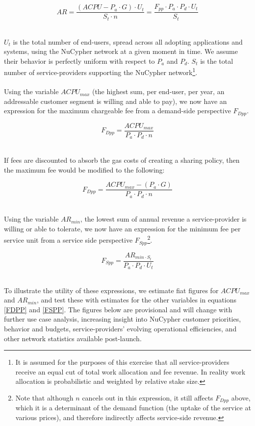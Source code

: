 \documentclass[longbibliography,nofootinbib]{revtex4-1}
\begin{document}
\begin{equation}
    AR = \frac{(ACPU - P_a \cdot G ) \cdot U_t}{S_t \cdot n} =  \frac{F_{pp} \cdot P_a \cdot P_d \cdot U_t}{S_t}
\end{equation} \
    
$U_t$ is the total number of end-users, spread across all adopting applications and systems, using the NuCypher network at a given moment in time. We assume their behavior is perfectly uniform with respect to $P_a$ and $P_d$. $S_t$ is the total number of service-providers supporting the NuCypher network\footnote{It is assumed for the purposes of this exercise that all service-providers receive an equal cut of total work allocation and fee revenue. In reality work allocation is probabilistic and weighted by relative stake size.}.
\\\\
Using the variable $ACPU_{max}$ (the highest sum, per end-user, per year, an addressable customer segment is willing and able to pay), we now have an expression for the maximum chargeable fee from a demand-side perspective $F_{Dpp}$. 

\begin{equation}
\label{FDPP}
    F_{Dpp} = \frac{ACPU_{max}}{P_a \cdot P_d \cdot n}
\end{equation} \

If fees are discounted to absorb the gas costs of creating a sharing policy, then the maximum fee would be modified to the following: 

\begin{equation}
    F_{Dpp} = \frac{ACPU_{max} - (P_a \cdot G)}{P_a \cdot P_d \cdot n}
\end{equation} \

Using the variable $AR_{min}$, the lowest sum of annual revenue a service-provider is willing or able to tolerate, we now have an expression for the minimum fee per service unit from a service side perspective $F_{Spp}$\footnote{Note that although $n$ cancels out in this expression, it still affects $F_{Dpp}$ above, which it is a determinant of the demand function (the uptake of the service at various prices), and therefore indirectly affects service-side revenue.}.

\begin{equation}
\label{FSPP}
    F_{Spp} = \frac{AR_{min \cdot S_t}}{P_a \cdot P_d \cdot U_t}
\end{equation} \ 

To illustrate the utility of these expressions, we estimate fiat figures for $ACPU_{max}$ and $AR_{min}$, and test these with estimates for the other variables in equations \ref{FDPP} and \ref{FSPP}. The figures below are provisional and will change with further use case analysis, increasing insight into NuCypher customer priorities, behavior and budgets, service-providers' evolving operational efficiencies, and other network statistics available post-launch.
\\
\end{document}
